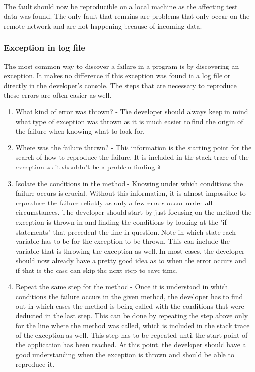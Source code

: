 \paragraph{} The fault should now be reproducible on a local machine as the affecting test data was found. The only fault that remains are problems that only occur on the remote network and are not happening because of incoming data.

\subsubsection{Exception in log file}
The most common way to discover a failure in a program is by discovering an exception. It makes no difference if this exception was found in a log file or directly in the developer's console. The steps that are necessary to reproduce these errors are often easier as well.

\begin{enumerate}
  \item What kind of error was thrown? - The developer should always keep in mind what type of exception was thrown as it is much easier to find the origin of the failure when knowing what to look for.
  \item Where was the failure thrown? - This information is the starting point for the search of how to reproduce the failure. It is included in the stack trace of the exception so it shouldn't be a problem finding it.
  \item Isolate the conditions in the method - Knowing under which conditions the failure occurs is crucial. Without this information, it is almost impossible to reproduce the failure reliably as only a few errors occur under all circumstances. The developer should start by just focusing on the method the exception is thrown in and finding the conditions by looking at the "if statements" that precedent the line in question. Note in which state each variable has to be for the exception to be thrown. This can include the variable that is throwing the exception as well. In most cases, the developer should now already have a pretty good idea as to when the error occurs and if that is the case can skip the next step to save time.
  \item Repeat the same step for the method - Once it is understood in which conditions the failure occurs in the given method, the developer has to find out in which cases the method is being called with the conditions that were deducted in the last step. This can be done by repeating the step above only for the line where the method was called, which is included in the stack trace of the exception as well. This step has to be repeated until the start point of the application has been reached. At this point, the developer should have a good understanding when the exception is thrown and should be able to reproduce it.
\end{enumerate}

